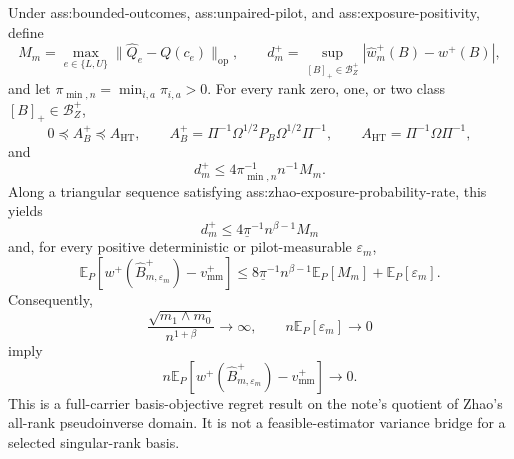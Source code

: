 Under ass:bounded-outcomes, ass:unpaired-pilot, and ass:exposure-positivity, define
\[
 M_m=\max_{e\in\{L,U\}}\lVert\widehat Q_e-Q(c_e)\rVert_{\mathrm{op}},
 \qquad
 d_m^+=\sup_{[B]_+\in\mathcal B_Z^+}
 |\widehat w_m^+(B)-w^+(B)|,
\]
and let \(\pi_{\min,n}=\min_{i,a}\pi_{i,a}>0\).  For every rank zero, one, or two class \([B]_+\in\mathcal B_Z^+\),
\[
 0\preceq A_B^+\preceq A_{\mathrm{HT}},
 \qquad
 A_B^+=\Pi^{-1}\Omega^{1/2}P_B\Omega^{1/2}\Pi^{-1},
 \qquad
 A_{\mathrm{HT}}=\Pi^{-1}\Omega\Pi^{-1},
\]
and
\[
 d_m^+\le 4\pi_{\min,n}^{-1}n^{-1}M_m.
\]
Along a triangular sequence satisfying ass:zhao-exposure-probability-rate, this yields
\[
 d_m^+\le4\underline\pi^{-1}n^{\beta-1}M_m
\tag{A}
\]
and, for every positive deterministic or pilot-measurable \(\varepsilon_m\),
\[
 \mathbb E_P\!\left[
 w^+(\widehat B_{m,\varepsilon_m}^+)-v_{\mathrm{mm}}^+
 \right]
 \le
 8\underline\pi^{-1}n^{\beta-1}\mathbb E_P[M_m]
 +\mathbb E_P[\varepsilon_m].
\tag{B}
\]
Consequently,
\[
 \frac{\sqrt{m_1\wedge m_0}}{n^{1+\beta}}\longrightarrow\infty,
 \qquad n\mathbb E_P[\varepsilon_m]\longrightarrow0
\]
imply
\[
 n\mathbb E_P\!\left[
 w^+(\widehat B_{m,\varepsilon_m}^+)-v_{\mathrm{mm}}^+
 \right]\longrightarrow0.
\]
This is a full-carrier basis-objective regret result on the note's quotient of Zhao's all-rank pseudoinverse domain.  It is not a feasible-estimator variance bridge for a selected singular-rank basis.